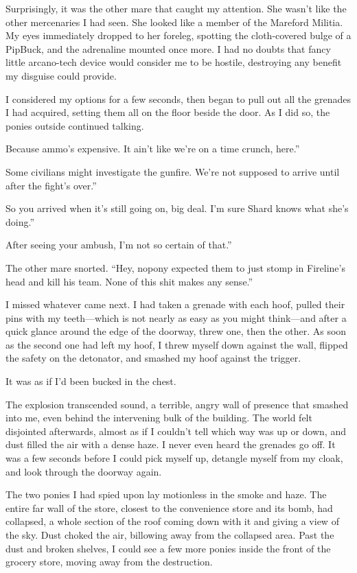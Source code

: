 Surprisingly, it was the other mare that caught my attention. She wasn’t like the other mercenaries I had seen. She looked like a member of the Mareford Militia. My eyes immediately dropped to her foreleg, spotting the cloth-covered bulge of a PipBuck, and the adrenaline mounted once more. I had no doubts that fancy little arcano-tech device would consider me to be hostile, destroying any benefit my disguise could provide.

I considered my options for a few seconds, then began to pull out all the grenades I had acquired, setting them all on the floor beside the door. As I did so, the ponies outside continued talking.

\leavevmode{}Because ammo’s expensive. It ain’t like we’re on a time crunch, here.”

\leavevmode{}Some civilians might investigate the gunfire. We’re not supposed to arrive until after the fight’s over.”

\leavevmode{}So you arrived when it’s still going on, big deal. I’m sure Shard knows what she’s doing.”

\leavevmode{}After seeing your ambush, I’m not so certain of that.”

The other mare snorted. “Hey, nopony expected them to just stomp in Fireline’s head and kill his team. None of this shit makes any sense.”

I missed whatever came next. I had taken a grenade with each hoof, pulled their pins with my teeth—which is not nearly as easy as you might think—and after a quick glance around the edge of the doorway, threw one, then the other. As soon as the second one had left my hoof, I threw myself down against the wall, flipped the safety on the detonator, and smashed my hoof against the trigger.

It was as if I’d been bucked in the chest.

The explosion transcended sound, a terrible, angry wall of presence that smashed into me, even behind the intervening bulk of the building. The world felt disjointed afterwards, almost as if I couldn’t tell which way was up or down, and dust filled the air with a dense haze. I never even heard the grenades go off. It was a few seconds before I could pick myself up, detangle myself from my cloak, and look through the doorway again.

The two ponies I had spied upon lay motionless in the smoke and haze. The entire far wall of the store, closest to the convenience store and its bomb, had collapsed, a whole section of the roof coming down with it and giving a view of the sky. Dust choked the air, billowing away from the collapsed area. Past the dust and broken shelves, I could see a few more ponies inside the front of the grocery store, moving away from the destruction.

